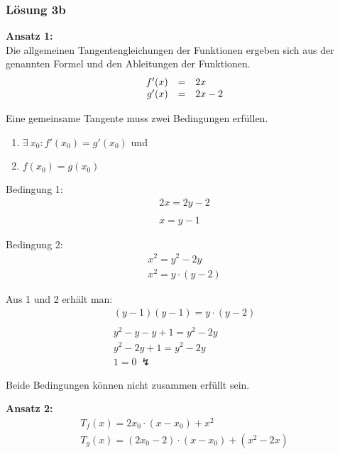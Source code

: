 \documentclass[main.tex]{subfiles}
\begin{document}
\subsubsection*{Lösung 3b}

\textbf{Ansatz 1:}\\

Die allgemeinen Tangentengleichungen der Funktionen ergeben sich aus der genannten Formel und den Ableitungen der Funktionen.
\begin{equation*}
    \begin{array}{ r c l }
        f'( x) & = & 2x\\
        g'( x) & = & 2x-2
    \end{array}
\end{equation*}

Eine gemeinsame Tangente muss zwei Bedingungen erfüllen.
\begin{enumerate}
    \item $\exists \ x_{0} :f'( x_{0}) =g'( x_{0})$ und
    \item $f( x_{0}) =g( x_{0})$
\end{enumerate}



Bedingung 1:
\begin{gather*}
    2x=2y-2\\
    \\
    x=y-1
\end{gather*}


Bedingung 2:
\begin{gather*}
    x^{2} =y^{2} -2y\\
    x^{2} =y\cdotp ( y-2)
\end{gather*}

Aus 1 und 2 erhält man:
\begin{gather*}
    ( y-1)( y-1) =y\cdotp ( y-2)\\
    \\
    y^{2} -y-y+1=y^{2} -2y\\
    y^{2} -2y+1=y^{2} -2y\\
    1=0\ \lightning 
\end{gather*}

Beide Bedingungen können nicht zusammen erfüllt sein. 

\textbf{Ansatz 2:}\\

\begin{gather*}
    T_{f}( x) =2x_{0} \cdotp ( x-x_{0}) +x^{2}\\
    T_{g}( x) =( 2x_{0} -2) \cdotp ( x-x_{0}) +\left( x^{2} -2x\right)
\end{gather*}
\end{document}
